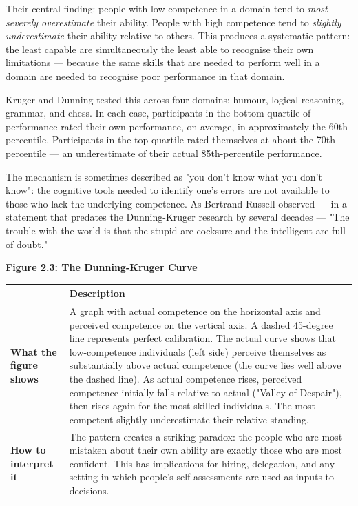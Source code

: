 \documentclass[12pt, letterpaper]{article}
\begin{document}
Their central finding: people with low competence in a domain tend to \textit{most severely overestimate} their ability. People with high competence tend to \textit{slightly underestimate} their ability relative to others. This produces a systematic pattern: the least capable are simultaneously the least able to recognise their own limitations --- because the same skills that are needed to perform well in a domain are needed to recognise poor performance in that domain.

Kruger and Dunning tested this across four domains: humour, logical reasoning, grammar, and chess. In each case, participants in the bottom quartile of performance rated their own performance, on average, in approximately the 60th percentile. Participants in the top quartile rated themselves at about the 70th percentile --- an underestimate of their actual 85th-percentile performance.

The mechanism is sometimes described as "you don't know what you don't know": the cognitive tools needed to identify one's errors are not available to those who lack the underlying competence. As Bertrand Russell observed --- in a statement that predates the Dunning-Kruger research by several decades --- "The trouble with the world is that the stupid are cocksure and the intelligent are full of doubt."

\textbf{Figure 2.3: The Dunning-Kruger Curve}



\begin{table}[H]
\centering
\small
\begin{tabularx}{\linewidth}{lY}
\toprule
 & Description \\
\midrule
\textbf{What the figure shows} & A graph with actual competence on the horizontal axis and perceived competence on the vertical axis. A dashed 45-degree line represents perfect calibration. The actual curve shows that low-competence individuals (left side) perceive themselves as substantially above actual competence (the curve lies well above the dashed line). As actual competence rises, perceived competence initially falls relative to actual ("Valley of Despair"), then rises again for the most skilled individuals. The most competent slightly underestimate their relative standing. \\
\textbf{How to interpret it} & The pattern creates a striking paradox: the people who are most mistaken about their own ability are exactly those who are most confident. This has implications for hiring, delegation, and any setting in which people's self-assessments are used as inputs to decisions. \\
\bottomrule
\end{tabularx}
\end{table}
\end{document}
